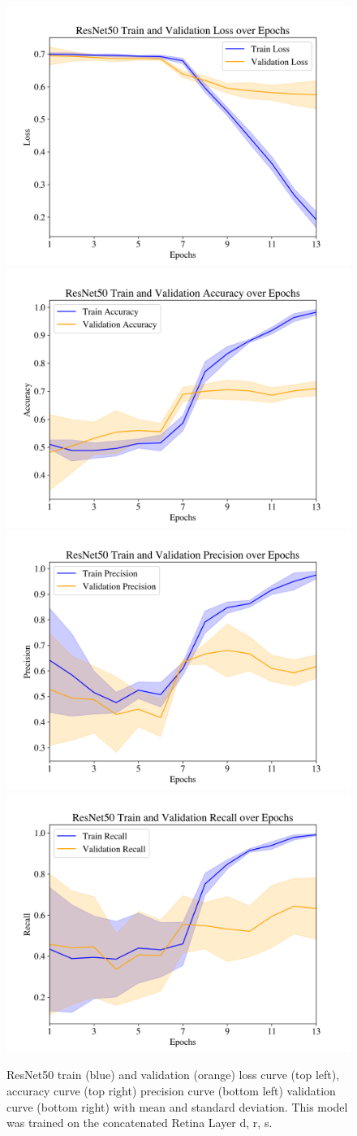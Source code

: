 \documentclass{article} %
\begin{document}
\begin{figure}[h]
\begin{center}
\includegraphics[width=.4\linewidth]{../3d/plots/resnet50/loss.png}
\includegraphics[width=.4\linewidth]{../3d/plots/resnet50/accuracy.png}
\includegraphics[width=.4\linewidth]{../3d/plots/resnet50/precision.png}
\includegraphics[width=.4\linewidth]{../3d/plots/resnet50/recall.png}
\end{center}
\caption{ResNet50 train (blue) and validation (orange) loss curve (top left), accuracy curve (top right) precision curve (bottom left) validation curve (bottom right) with mean and standard deviation. This model was trained on the concatenated Retina Layer d, r, s.}
\end{figure}
\end{document}
